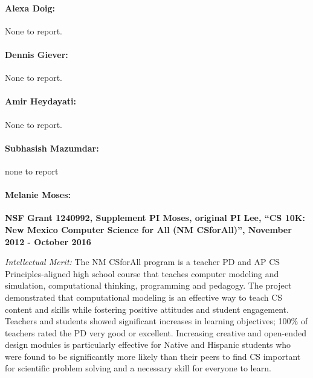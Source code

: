 \paragraph{Alexa Doig:} None to report.

\paragraph{Dennis Giever:} None to report.

\paragraph{Amir Heydayati:} None to report.

\paragraph{Subhasish Mazumdar:} none to report

\paragraph{Melanie Moses:}
\textbf{NSF Grant 1240992, Supplement PI Moses, original PI Lee, ``CS 10K: New Mexico Computer Science for All (NM CSforAll)'', November 2012 - October 2016} 

\noindent \textit{Intellectual Merit:} The NM CSforAll program is a teacher PD and AP CS Principles-aligned high school course that teaches computer modeling and simulation, computational thinking, programming and pedagogy. %
The project demonstrated that computational modeling is an effective way to teach CS content and skills while fostering positive attitudes and student engagement.
Teachers and students showed significant increases in learning objectives; 100\% of teachers rated the PD very good or excellent. Increasing creative and open-ended design modules is particularly effective for Native and Hispanic students who were found to be significantly more likely than their peers to find CS important for scientific problem solving and a necessary skill for everyone to learn.

